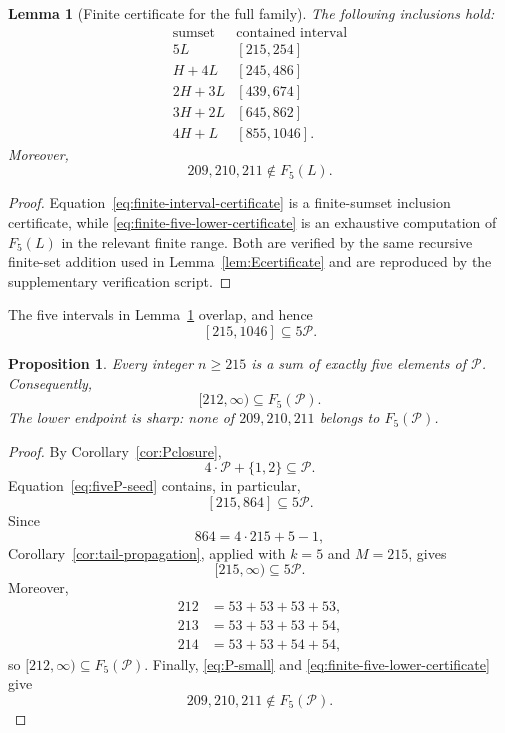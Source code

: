 \documentclass[11pt]{article}
\theoremstyle{plain}
\newtheorem{proposition}[theorem]{Proposition}
\newtheorem{lemma}[theorem]{Lemma}
\theoremstyle{definition}
\newcommand{\Pset}{\mathcal P}
\begin{document}
\begin{lemma}[Finite certificate for the full family]\label{lem:finitefive}
The following inclusions hold:
\begin{equation}\label{eq:finite-interval-certificate}
\begin{array}{c|c}
\text{sumset}&\text{contained interval}\\ \hline
5L &[215,254]\\
H+4L &[245,486]\\
2H+3L &[439,674]\\
3H+2L &[645,862]\\
4H+L &[855,1046].
\end{array}
\end{equation}
Moreover,
\begin{equation}\label{eq:finite-five-lower-certificate}
 209,210,211\notin F_5(L).
\end{equation}
\end{lemma}

\begin{proof}
Equation~\eqref{eq:finite-interval-certificate} is a finite-sumset
inclusion certificate, while \eqref{eq:finite-five-lower-certificate}
is an exhaustive computation of $F_5(L)$ in the relevant finite range.
Both are verified by the same recursive finite-set addition used in
Lemma~\ref{lem:Ecertificate} and are reproduced by the supplementary
verification script.
\end{proof}

The five intervals in Lemma~\ref{lem:finitefive} overlap, and hence
\begin{equation}\label{eq:fiveP-seed}
 [215,1046]\subseteq5\Pset.
\end{equation}

\begin{proposition}\label{prop:fiveP}
Every integer $n\geq215$ is a sum of exactly five elements of $\Pset$.
Consequently,
\[
 [212,\infty)\subseteq F_5(\Pset).
\]
The lower endpoint is sharp: none of $209,210,211$ belongs to
$F_5(\Pset)$.
\end{proposition}

\begin{proof}
By Corollary~\ref{cor:Pclosure},
\[
 4\cdot\Pset+\{1,2\}\subseteq\Pset.
\]
Equation~\eqref{eq:fiveP-seed} contains, in particular,
\[
 [215,864]\subseteq5\Pset.
\]
Since
\[
 864=4\cdot215+5-1,
\]
Corollary~\ref{cor:tail-propagation}, applied with $k=5$ and $M=215$,
gives
\[
 [215,\infty)\subseteq5\Pset.
\]
Moreover,
\[
\begin{aligned}
212&=53+53+53+53,\\
213&=53+53+53+54,\\
214&=53+53+54+54,
\end{aligned}
\]
so $[212,\infty)\subseteq F_5(\Pset)$.  Finally,
\eqref{eq:P-small} and \eqref{eq:finite-five-lower-certificate} give
\[
 209,210,211\notin F_5(\Pset).
\]
\end{proof}
\end{document}
